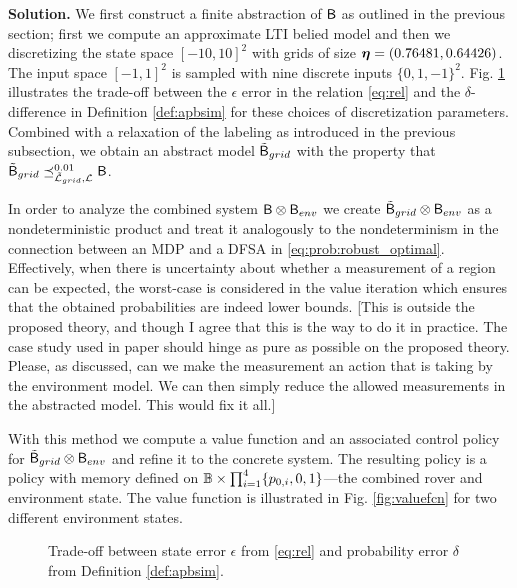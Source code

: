 \documentclass{ifacconf}
\newcommand{\red}[1]{{\color{red} #1}}
\begin{document}
\textbf{Solution.} We first construct a finite abstraction of $\mathsf{B}$ as outlined in the previous section; first we compute an approximate LTI belied model and then we  discretizing the state space $[-10, 10]^2$ with  grids of size ${\boldsymbol{\eta}} = (0.76481, 0.64426)$. The input space $[-1,1]^2$ is sampled with nine discrete inputs $\{0, 1, -1\}^2$. Fig.  \ref{fig:tradeoff} illustrates the trade-off between the $\epsilon$ error in the relation \eqref{eq:rel} and the $\delta$-difference in Definition \ref{def:apbsim} for these choices of discretization parameters. Combined with a relaxation of the labeling as introduced in the previous subsection, %
we obtain an abstract model $\tilde {\mathsf{B}}_{grid}$ with the property that $\tilde {\mathsf{B}}_{grid}\preceq^{0.01}_{\tilde{\mathcal{L}}_{grid},\mathcal{L}} \mathsf{B} $.

\red{In order to analyze the combined system $\mathsf{B} \otimes \mathsf{B}_{env}$ we create $\tilde {\mathsf{B}}_{grid} \otimes \mathsf{B}_{env}$ as a nondeterministic product and treat it analogously to the nondeterminism in the connection between an MDP and a DFSA in \eqref{eq:prob:robust_optimal}. Effectively, when there is uncertainty about whether a measurement of a region can be expected, the worst-case is considered in the value iteration which ensures that the obtained probabilities are indeed lower bounds. [This is outside the proposed theory, and though I agree that this is the way to do it in practice. The case study used in  paper should hinge as pure as possible on the proposed theory. Please, as discussed, can we make the measurement an action that is taking by the environment model. We can then simply reduce the allowed measurements in the abstracted model. This would fix it all.]}

With this method we compute a value function and an associated control policy for $\tilde {\mathsf{B}}_{grid} \otimes \mathsf{B}_{env}$ and refine it to the concrete system.  \red{The resulting policy is a policy with memory defined on $\mathbb{B} \times \prod_{i=1}^4 \{ p_{0,i}, 0, 1 \}$---the combined rover and environment state. }The value function is illustrated in Fig. \ref{fig:valuefcn} for two different environment states.

\begin{figure}
  \footnotesize
  
  \caption{Trade-off between state error $\epsilon$ from \eqref{eq:rel} and probability error $\delta$ from Definition \ref{def:apbsim}.}
  \label{fig:tradeoff}
\end{figure}
\end{document}
